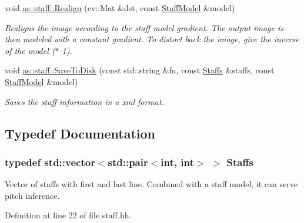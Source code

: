 \begin{DoxyCompactItemize}
void \hyperlink{namespaceas_1_1staff_af93180a3091e6494dc9983792c5113dc}{as\+::staff\+::\+Realign} (cv\+::\+Mat \&dst, const \hyperlink{structStaffModel}{Staff\+Model} \&model)
\begin{DoxyCompactList}\small\item\em Realigns the image according to the staff model gradient. The output image is then modeled with a constant gradient. To distort back the image, give the inverse of the model ($\ast$-\/1). \end{DoxyCompactList}\item 
void \hyperlink{namespaceas_1_1staff_a568fd337876db996340be89931a8b908}{as\+::staff\+::\+Save\+To\+Disk} (const std\+::string \&fn, const \hyperlink{staff_8hh_acfffa1dd2bf9ce5820435e63446a7c90}{Staffs} \&staffs, const \hyperlink{structStaffModel}{Staff\+Model} \&model)
\begin{DoxyCompactList}\small\item\em Saves the staff information in a xml format. \end{DoxyCompactList}\end{DoxyCompactItemize}


\subsection{Typedef Documentation}
\subsubsection[{\texorpdfstring{Staffs}{Staffs}}]{\setlength{\rightskip}{0pt plus 5cm}typedef std\+::vector$<$std\+::pair$<$int, int$>$ $>$ {\bf Staffs}}\hypertarget{staff_8hh_acfffa1dd2bf9ce5820435e63446a7c90}{}\label{staff_8hh_acfffa1dd2bf9ce5820435e63446a7c90}


Vector of staffs with first and last line. Combined with a staff model, it can serve pitch inference. 



Definition at line 22 of file staff.\+hh.

